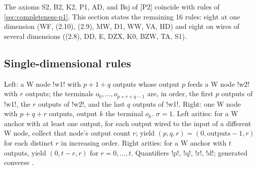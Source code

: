 The axioms S2, B2, K2, P1, AD, and Bsj of [P2] coincide with rules of \cref{sec:completeness-p1}.
This section states the remaining 16 rules: eight at one dimension (WF, (2.10), (2.9), MW, D1, WW,
VA, HD) and eight on wires of several dimensions ((2.8), DD, E, DZX, K0, BZW, TA, S1).

\subsection{Single-dimensional rules}

Left: a W node \code!w1! with $p+1+q$ outputs whose output $p$ feeds a W node \code!w2! with $r$
outputs; the terminals $o_0,\dots,o_{p+r+q-1}$ are, in order, the first $p$ outputs of \code!w1!,
the $r$ outputs of \code!w2!, and the last $q$ outputs of \code!w1!. Right: one W node with
$p+q+r$ outputs, output $k$ the terminal $o_k$. $\sigma=1$. Left arities: for a W anchor with at
least one output, for each output wired to the input of a different W node, collect that node's
output count $r$; yield $(p,q,r)=(0,\text{outputs}-1,r)$ for each distinct $r$ in increasing
order. Right arities: for a W anchor with $t$ outputs, yield $(0,t-r,r)$ for $r=0,\dots,t$.
Quantifiers \code!p!, \code!q!, \code!r!, \code!d!; generated converse .

